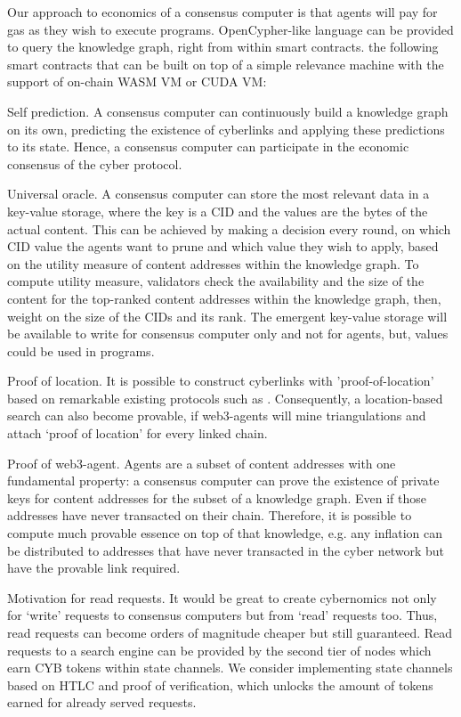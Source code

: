 \documentclass[8pt,oneside]{amsart}
\newcommand{\linkgreen}[2]{\href{#1}{\color{green}{#2}}}
\newcommand{\code}[1]{{\PlayBold #1}}
\begin{document}
\begin{Abstract}
Our approach to economics of a consensus computer is that agents will pay for gas as they wish to execute programs. OpenCypher-like language can be provided to query the knowledge graph, right from within smart contracts. \linkgreen{https://medium.com/@karpathy/software-2-0-a64152b37c35}{We can envision} the following smart contracts that can be built on top of a simple relevance machine with the support of on-chain WASM VM or CUDA VM:

\code{Self prediction}. A consensus computer can continuously build a knowledge graph on its own, predicting the existence of cyberlinks and applying these predictions to its state. Hence, a consensus computer can participate in the economic consensus of the cyber protocol.

\code{Universal oracle}. A consensus computer can store the most relevant data in a key-value storage, where the key is a CID and the values are the bytes of the actual content. This can be achieved by making a decision every round, on which CID value the agents want to prune and which value they wish to apply, based on the utility measure of content addresses within the knowledge graph. To compute utility measure, validators check the availability and the size of the content for the top-ranked content addresses within the knowledge graph, then, weight on the size of the CIDs and its rank. The emergent key-value storage will be available to write for consensus computer only and not for agents, but, values could be used in programs.

\code{Proof of location}. It is possible to construct cyberlinks with 'proof-of-location' based on remarkable existing protocols such as \linkgreen{https://ipfs.io/ipfs/QmZYKGuLHf2h1mZrhiP2FzYsjj3tWt2LYduMCRbpgi5pKG}{Foam}. Consequently, a location-based search can also become provable, if web3-agents will mine triangulations and attach ‘proof of location’ for every linked chain.

\code{Proof of web3-agent}. Agents are a subset of content addresses with one fundamental property: a consensus computer can prove the existence of private keys for content addresses for the subset of a knowledge graph. Even if those addresses have never transacted on their chain. Therefore, it is possible to compute much provable essence on top of that knowledge, e.g. any inflation can be distributed to addresses that have never transacted in the cyber network but have the provable link required.

\code{Motivation for read requests}. It would be great to create cybernomics not only for ‘write’ requests to consensus computers but from ‘read’ requests too. Thus, read requests can become orders of magnitude cheaper but still guaranteed. Read requests to a search engine can be provided by the second tier of nodes which earn CYB tokens within state channels. We consider implementing state channels based on HTLC and proof of verification, which unlocks the amount of tokens earned for already served requests.


\end{Abstract}
\end{document}
